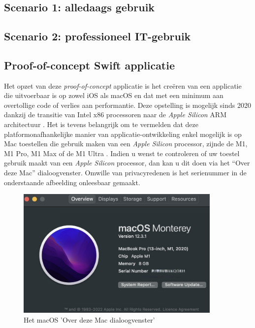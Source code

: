 
\chapter{}
\label{ch:methodologie}

\section{Scenario 1: alledaags gebruik}
\lipsum[1-4]

\section{Scenario 2: professioneel IT-gebruik}
\lipsum[1-4]

\pagebreak
\section{Proof-of-concept Swift applicatie}
Het opzet van deze \textit{proof-of-concept} applicatie is het creëren van een applicatie die uitvoerbaar is op zowel iOS als macOS en dat met een minimum aan overtollige code of verlies aan performantie. Deze opstelling is mogelijk sinds 2020 dankzij de transitie van Intel x86 processoren naar de \textit{Apple Silicon} ARM architectuur \autocite{Apple2020}. Het is tevens belangrijk om te vermelden dat deze platformonafhankelijke manier van applicatie-ontwikkeling enkel mogelijk is op Mac toestellen die gebruik maken van een \textit{Apple Silicon} processor, zijnde de M1, M1 Pro, M1 Max of de M1 Ultra \autocite{AppleDeveloper2022a}. Indien u wenst te controleren of uw toestel gebruik maakt van een \textit{Apple Silicon} processor, dan kan u dit doen via het “Over deze Mac” dialoogvenster. Omwille van privacyredenen is het serienummer in de onderstaande afbeelding onleesbaar gemaakt.

\begin{figure}[h]
    \centering
    \includegraphics[width=100mm, scale=0.5]{img/overdezemac.jpeg}
    \caption{Het macOS 'Over deze Mac dialoogvenster'}
\end{figure}


